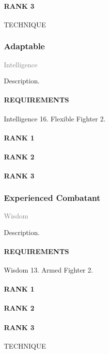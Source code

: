 \paragraph{RANK 3} TECHNIQUE

\subsubsection{Adaptable} \label{feat::adaptable} %
\small{\textcolor{gray}{Intelligence}}

\normalsize
Description.
\paragraph{REQUIREMENTS} Intelligence 16. Flexible Fighter 2.
\paragraph{RANK 1} %
\paragraph{RANK 2}
\paragraph{RANK 3}

\subsubsection{Experienced Combatant} \label{feat::experiencedcombatant} %
\small{\textcolor{gray}{Wisdom}}

\normalsize
Description.
\paragraph{REQUIREMENTS} Wisdom 13. Armed Fighter 2.
\paragraph{RANK 1}
\paragraph{RANK 2}
\paragraph{RANK 3} TECHNIQUE

